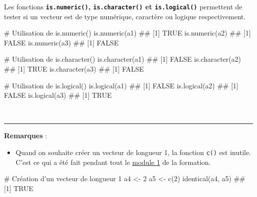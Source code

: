 \documentclass[12pt,twosided, notitlepage]{book}
\newenvironment{Shaded}{}{}
\newcommand{\KeywordTok}[1]{\textcolor[rgb]{0.00,0.00,1.00}{#1}}
\newcommand{\DecValTok}[1]{#1}
\newcommand{\StringTok}[1]{\textcolor[rgb]{0.00,0.50,0.50}{#1}}
\newcommand{\CommentTok}[1]{\textcolor[rgb]{0.00,0.50,0.00}{#1}}
\newcommand{\NormalTok}[1]{#1}
\providecommand{\tightlist}{%
  \setlength{\itemsep}{0pt}\setlength{\parskip}{0pt}}
\renewenvironment{Shaded}{\begin{snugshade}}{\end{snugshade}}
\begin{document}
Les fonctions \textbf{\texttt{is.numeric()}, \texttt{is.character()} et
\texttt{is.logical()}}
permettent de tester si un vecteur est de type numérique, caractère ou
logique respectivement.

\begin{Shaded}
\begin{Highlighting}[]
\CommentTok{# Utilisation de is.numeric()}
\KeywordTok{is.numeric}\NormalTok{(a1)}
\NormalTok{  ## [1] TRUE}
\KeywordTok{is.numeric}\NormalTok{(a2)}
\NormalTok{  ## [1] FALSE}
\KeywordTok{is.numeric}\NormalTok{(a3)}
\NormalTok{  ## [1] FALSE}

\CommentTok{# Utilisation de is.character()}
\KeywordTok{is.character}\NormalTok{(a1)}
\NormalTok{  ## [1] FALSE}
\KeywordTok{is.character}\NormalTok{(a2)}
\NormalTok{  ## [1] TRUE}
\KeywordTok{is.character}\NormalTok{(a3)}
\NormalTok{  ## [1] FALSE}

\CommentTok{# Utilisation de is.logical()}
\KeywordTok{is.logical}\NormalTok{(a1)}
\NormalTok{  ## [1] FALSE}
\KeywordTok{is.logical}\NormalTok{(a2)}
\NormalTok{  ## [1] FALSE}
\KeywordTok{is.logical}\NormalTok{(a3)}
\NormalTok{  ## [1] TRUE}
\end{Highlighting}
\end{Shaded}

~

\begin{center}\rule{0.5\linewidth}{\linethickness}\end{center}

\textbf{Remarques} :

\begin{itemize}
\tightlist
\item
  Quand on souhaite créer un vecteur de longueur 1, la fonction
  \texttt{c()} est inutile. C'est ce qui a été fait pendant tout le
  \underline{module 1} de la formation.
\end{itemize}

\begin{Shaded}
\begin{Highlighting}[]
\CommentTok{# Création d'un vecteur de longueur 1}
\NormalTok{a4 <-}\StringTok{ }\DecValTok{2}
\NormalTok{a5 <-}\StringTok{ }\KeywordTok{c}\NormalTok{(}\DecValTok{2}\NormalTok{)}
\KeywordTok{identical}\NormalTok{(a4, a5)}
\NormalTok{  ## [1] TRUE}
\end{Highlighting}
\end{Shaded}
\end{document}
